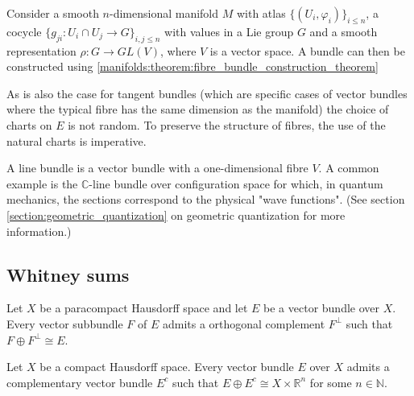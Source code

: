 	\begin{construct}\label{manifolds:vector_bundle_construction}
		Consider a smooth $n$-dimensional manifold $M$ with atlas $\{(U_i, \varphi_i)\}_{i\leq n}$, a cocycle $\{g_{ji}: U_i\cap U_j\rightarrow G\}_{i,j\leq n}$ with values in a Lie group $G$ and a smooth representation $\rho:G\rightarrow GL(V)$, where $V$ is a vector space. A bundle can then be constructed using \ref{manifolds:theorem:fibre_bundle_construction_theorem}
	\end{construct}

	\begin{remark}
		As is also the case for tangent bundles (which are specific cases of vector bundles where the typical fibre has the same dimension as the manifold) the choice of charts on $E$ is not random. To preserve the structure of fibres, the use of the natural charts is imperative.
	\end{remark}
	
	\begin{example}
		A line bundle is a vector bundle with a one-dimensional fibre $V$. A common example is the $\mathbb{C}$-line bundle over configuration space for which, in quantum mechanics, the sections correspond to the physical "wave functions". (See section \ref{section:geometric_quantization} on geometric quantization for more information.)
	\end{example}
	
\subsection{Whitney sums}

	
	\begin{property}
		Let $X$ be a paracompact Hausdorff space and let $E$ be a vector bundle over $X$. Every vector subbundle $F$ of $E$ admits a orthogonal complement $F^\perp$ such that $F\oplus F^\perp \cong E$.
	\end{property}
	\begin{property}\label{bundles:prop:hausdorff}
		Let $X$ be a compact Hausdorff space. Every vector bundle $E$ over $X$ admits a complementary vector bundle $E^c$ such that $E\oplus E^c \cong X\times\mathbb{R}^n$ for some $n\in\mathbb{N}$.
	\end{property}
	
